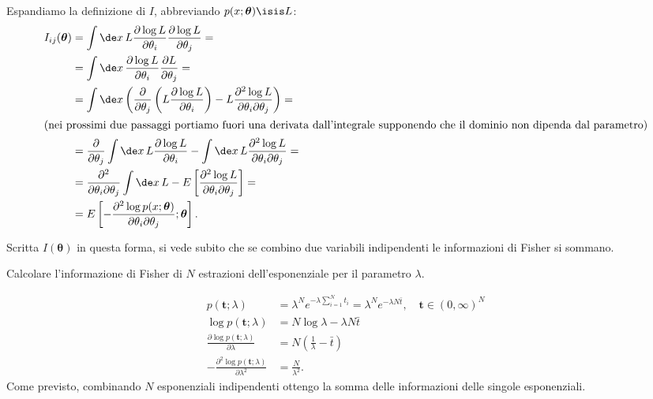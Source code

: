 \begin{solution}
    Espandiamo la definizione di $I$, abbreviando $p(x;\boldsymbol\theta)\isis
    L$:
    \begin{align*}
    	I_{ij}(\boldsymbol\theta)
    	&= \int\de x\, L
    	\frac{\partial\log L}{\partial\theta_i}
    	\frac{\partial\log L}{\partial\theta_j} = \\
    	&= \int\de x\,
    	\frac{\partial\log L}{\partial\theta_i}
    	\frac{\partial L}{\partial\theta_j} = \\
    	&= \int\de x \left(
    	\frac{\partial}{\partial\theta_j} \left( L \frac{\partial\log L}{\partial\theta_i} \right)
    	- L \frac{\partial^2\log L}{\partial\theta_i\partial\theta_j} \right) = \\
    	\intertext{(nei prossimi due passaggi portiamo fuori una derivata dall'integrale supponendo che il dominio non dipenda dal parametro)}
    	&= \frac{\partial}{\partial\theta_j} \int\de x\, L \frac{\partial\log L}{\partial\theta_i}
    	- \int\de x\, L \frac{\partial^2\log L}{\partial\theta_i\partial\theta_j} = \\
    	&= \frac{\partial^2}{\partial\theta_i\partial\theta_j} \int\de x\, L
    	- E \left[ \frac{\partial^2\log L}{\partial\theta_i\partial\theta_j} \right] = \\
    	&= E \left[ -\frac{\partial^2\log p(x;\boldsymbol\theta)}{\partial\theta_i\partial\theta_j};\boldsymbol\theta \right].
    \end{align*}
\end{solution}%
%
Scritta $I(\boldsymbol\theta)$ in questa forma, si vede subito che se combino
due variabili indipendenti le informazioni di Fisher si sommano.

\begin{exercise}
    
    Calcolare l'informazione di Fisher di $N$ estrazioni dell'esponenziale
    per il parametro $\lambda$.

\end{exercise}

\begin{solution}
	\begin{align*}
		p(\mathbf t;\lambda)
		&= \lambda^N e^{-\lambda\sum_{i=1}^N t_i}
		= \lambda^N e^{-\lambda N \bar t}, \quad \mathbf t\in(0,\infty)^N \\
		\log p(\mathbf t;\lambda)
		&= N\log\lambda - \lambda N\bar t \\
		\frac{\partial \log p(\mathbf t;\lambda)}{\partial\lambda}
		&= N \left( \frac1\lambda - \bar t \right) \\
		-\frac{\partial^2 \log p(\mathbf t;\lambda)}{\partial\lambda^2}
		&= \frac N{\lambda^2}.
	\end{align*}
    Come previsto, combinando $N$ esponenziali indipendenti ottengo la somma
    delle informazioni delle singole esponenziali.
\end{solution}

